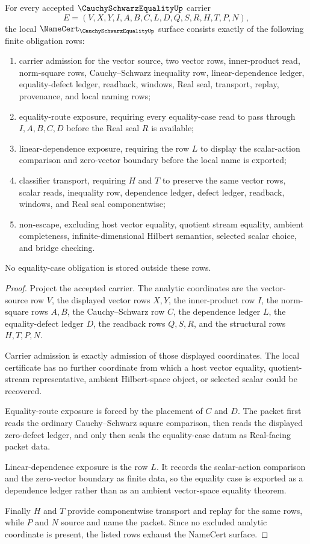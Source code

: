 \begin{theorem}
\label{thm:cauchy-schwarz-equality-namecert-obligations}
For every accepted $\CauchySchwarzEqualityUp$ carrier
$$
E=(V,X,Y,I,A,B,C,L,D,Q,S,R,H,T,P,N),
$$
the local $\NameCert_{\CauchySchwarzEqualityUp}$ surface consists exactly of the following finite obligation rows:
\begin{enumerate}
\item carrier admission for the vector source, two vector rows, inner-product read, norm-square rows, Cauchy--Schwarz inequality row, linear-dependence ledger, equality-defect ledger, readback, windows, Real seal, transport, replay, provenance, and local naming rows;
\item equality-route exposure, requiring every equality-case read to pass through $I,A,B,C,D$ before the Real seal $R$ is available;
\item linear-dependence exposure, requiring the row $L$ to display the scalar-action comparison and zero-vector boundary before the local name is exported;
\item classifier transport, requiring $H$ and $T$ to preserve the same vector rows, scalar reads, inequality row, dependence ledger, defect ledger, readback, windows, and Real seal componentwise;
\item non-escape, excluding host vector equality, quotient stream equality, ambient completeness, infinite-dimensional Hilbert semantics, selected scalar choice, and bridge checking.
\end{enumerate}
No equality-case obligation is stored outside these rows.
\end{theorem}
\begin{proof}
Project the accepted carrier. The analytic coordinates are the vector-source row $V$, the displayed vector rows $X,Y$, the inner-product row $I$, the norm-square rows $A,B$, the Cauchy--Schwarz row $C$, the dependence ledger $L$, the equality-defect ledger $D$, the readback rows $Q,S,R$, and the structural rows $H,T,P,N$.

Carrier admission is exactly admission of those displayed coordinates. The local certificate has no further coordinate from which a host vector equality, quotient-stream representative, ambient Hilbert-space object, or selected scalar could be recovered.

Equality-route exposure is forced by the placement of $C$ and $D$. The packet first reads the ordinary Cauchy--Schwarz square comparison, then reads the displayed zero-defect ledger, and only then seals the equality-case datum as Real-facing packet data.

Linear-dependence exposure is the row $L$. It records the scalar-action comparison and the zero-vector boundary as finite data, so the equality case is exported as a dependence ledger rather than as an ambient vector-space equality theorem.

Finally $H$ and $T$ provide componentwise transport and replay for the same rows, while $P$ and $N$ source and name the packet. Since no excluded analytic coordinate is present, the listed rows exhaust the NameCert surface.
\end{proof}
